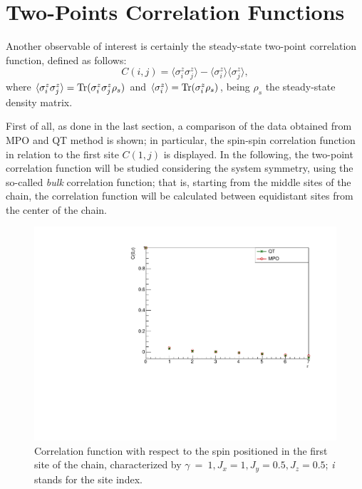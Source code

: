 \section{Two-Points Correlation Functions}
Another observable of interest is certainly the steady-state two-point correlation function, defined as follows:
\begin{equation}
    C(i, j) = \langle \sigma^z_i \sigma^z_j \rangle - \langle \sigma^z_i \rangle \langle \sigma^z_j \rangle,
\end{equation}
where $\langle \sigma^z_i \sigma^z_j \rangle = \operatorname{Tr}(\sigma^z_i \sigma^z_j \rho_{s})$ and $\langle \sigma^z_i \rangle = \operatorname{Tr}(\sigma^z_i \rho_{s})$, being $\rho_{s}$ the steady-state density matrix.

First of all, as done in the last section, a comparison of the data obtained from MPO and QT method is shown; in particular, the spin-spin correlation function in relation to the first site $C(1, j)$ is displayed. In the following, the two-point correlation function will be studied considering the system symmetry, using the so-called \emph{bulk} correlation function; that is, starting from the middle sites of the chain, the correlation function will be calculated between equidistant sites from the center of the chain. 

\begin{figure}[H]
    \centering
    \includegraphics[scale=0.7]{Figures/8sites/CorrFunc1_8s_J10505.pdf}
    \caption{Correlation function with respect to the spin positioned in the first site of the chain, characterized by $\gamma~=~1, J_x=1, J_y=0.5, J_z=0.5$; \emph{i} stands for the site index.}
    \label{fig:my_label}
\end{figure}

